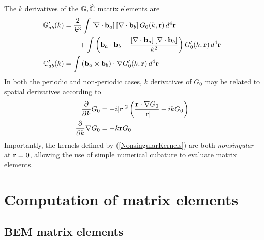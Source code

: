 \documentclass[letterpaper]{article}
\newcommand{\wh}{\widehat}
\begin{document}
The $k$ derivatives of the $\mb G, \wh{\mb C}$ matrix elements are
\begin{subequations}
\begin{align}
 \mathbb{G}^\prime_{ab}(k)
&= \frac{2}{k^3}
   \int \left[\nabla \cdot \mathbf{b}_a\right] 
        \left[\nabla \cdot \mathbf{b}_b\right] G_0(k,\mathbf{r})
   \, d^4 \mathbf{r}
\\
&\qquad
 +
 \int \left(\mathbf{b}_a \cdot \mathbf{b}_b 
            - \frac{ \left[\nabla \cdot \mathbf{b}_a\right]
                     \left[\nabla \cdot \mathbf{b}_b\right] 
                   }{k^2}
      \right) G_0^\prime(k,\mathbf{r})\, d^4\mathbf{r}
\\
\mathbb{C}^\prime_{ab}(k)
&= \int \left(\mathbf{b}_a \times \mathbf{b}_b \right) \cdot \nabla G_0^\prime(k,\mathbf{r})
   \,d^4 \mathbf{r}
\end{align}
\label{dGCabdOmega}
\end{subequations}
In both the periodic and non-periodic cases, $k$ derivatives of $G_0$
may be related to spatial derivatives according to
\begin{align}
 \frac{\partial }{\partial k} G_0
 &= -i|\mathbf{r}|^2 \left( \frac{\mathbf{r} \cdot \nabla G_0}{|\mathbf{r}|} - ik G_0\right)
\\
 \frac{\partial }{\partial k} \nabla G_0 
&= -k \mathbf{r} G_0
\label{NonsingularKernels}
\end{align}
Importantly, the kernels defined by (\ref{NonsingularKernels}) are
both \textit{nonsingular} at $\mathbf{r}=0$, allowing the use of simple
numerical cubature to evaluate matrix elements.

\newpage
\section{Computation of matrix elements}

\subsection{BEM matrix elements}
\end{document}
